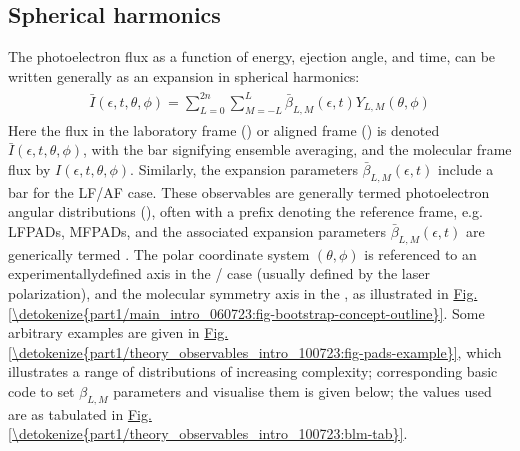 \documentclass[letterpaper,table,10pt,english]{jupyterBook}
\begin{document}
\subsection{Spherical harmonics}
\label{\detokenize{part1/theory_observables_intro_100723:spherical-harmonics}}\label{\detokenize{part1/theory_observables_intro_100723:sec-theory-sph-harm-intro}}
\sphinxAtStartPar
The photoelectron flux as a function of energy, ejection angle, and time, can be written generally as an expansion in spherical harmonics:
\begin{equation}\label{equation:part1/theory_observables_intro_100723:eq:AF-PAD-general}
\begin{split}
\begin{align}
\bar{I}(\epsilon,t,\theta,\phi)=\sum_{L=0}^{2n}\sum_{M=-L}^{L}\bar{\beta}_{L,M}(\epsilon,t)Y_{L,M}(\theta,\phi)
\end{align}
\end{split}
\end{equation}
\sphinxAtStartPar
Here the flux in the laboratory frame ({\hyperref[\detokenize{backmatter/glossary:term-LF}]{}}) or aligned frame ({\hyperref[\detokenize{backmatter/glossary:term-AF}]{}}) is denoted \(\bar{I}(\epsilon,t,\theta,\phi)\), with the bar signifying ensemble averaging, and the molecular frame flux by \(I(\epsilon,t,\theta,\phi)\). Similarly, the expansion parameters \(\bar{\beta}_{L,M}(\epsilon,t)\) include a bar for the LF/AF case. These observables are generally termed photoelectron angular distributions ({\hyperref[\detokenize{backmatter/glossary:term-PADs}]{}}), often with a prefix denoting the reference frame, e.g. LFPADs, MFPADs, and the associated expansion parameters \(\bar{\beta}_{L,M}(\epsilon,t)\) are generically termed {\hyperref[\detokenize{backmatter/glossary:term-anisotropy-paramters}]{}}. The polar coordinate system \((\theta,\phi)\) is referenced to
an experimentally\sphinxhyphen{}defined axis in the {\hyperref[\detokenize{backmatter/glossary:term-LF}]{}}/{\hyperref[\detokenize{backmatter/glossary:term-AF}]{}} case (usually defined by the laser polarization), and the molecular symmetry axis in the {\hyperref[\detokenize{backmatter/glossary:term-MF}]{}}, as illustrated in \hyperref[\detokenize{part1/main_intro_060723:fig-bootstrap-concept-outline}]{Fig.\@ \ref{\detokenize{part1/main_intro_060723:fig-bootstrap-concept-outline}}}. Some arbitrary examples are given in \hyperref[\detokenize{part1/theory_observables_intro_100723:fig-pads-example}]{Fig.\@ \ref{\detokenize{part1/theory_observables_intro_100723:fig-pads-example}}}, which illustrates a range of distributions of increasing complexity; corresponding basic code to set \(\beta_{L,M}\) parameters and visualise them is given below; the values used are as tabulated in \hyperref[\detokenize{part1/theory_observables_intro_100723:blm-tab}]{Fig.\@ \ref{\detokenize{part1/theory_observables_intro_100723:blm-tab}}}.
\end{document}
